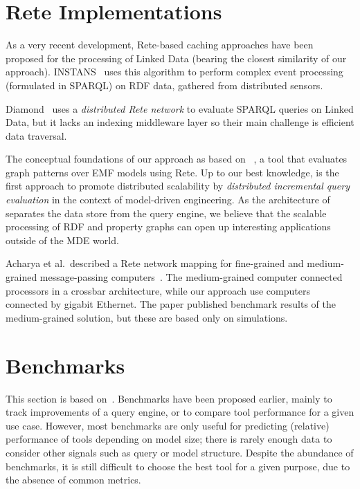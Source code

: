 \section{Rete Implementations}


As a very recent development, Rete-based caching approaches have been proposed for the processing of Linked Data (bearing the closest similarity of our approach). \mbox{INSTANS}~\cite{INSTANS2012} uses this algorithm to perform complex event processing (formulated in SPARQL) on RDF data, gathered from distributed sensors.

Diamond~\cite{miranker2012diamond} uses a \emph{distributed Rete network} to evaluate SPARQL queries on Linked Data, but it lacks an indexing middleware layer so their main challenge is efficient data traversal.

The conceptual foundations of our approach as based on \eiq{}~\cite{models10}, a tool that evaluates graph patterns over EMF models using Rete. Up to our best knowledge, \iqd{} is the first approach to promote distributed scalability by \emph{distributed incremental query evaluation} in the context of model-driven engineering. As the architecture of \iqd{} separates the data store from the query engine, we believe that the scalable processing of RDF and property graphs can open up interesting applications outside of the MDE world.

Acharya et al.\ described a Rete network mapping for fine-grained and medium-grained message-passing computers~\cite{message-passing-rete}. The medium-grained computer connected processors in a crossbar architecture, while our approach use computers connected by gigabit Ethernet. The paper published benchmark results of the medium-grained solution, but these are based only on simulations.

\section{Benchmarks}

This section is based on~\cite{ASE2013}. Benchmarks have been proposed earlier, mainly to track improvements of a query engine, or to compare tool performance for a given use case. However, most benchmarks are only useful for predicting (relative) performance of tools depending on model size; there is rarely enough data to consider other signals such as query or model structure. Despite the abundance of benchmarks, it is still difficult to choose the best tool for a given purpose, due to the absence of common
metrics.

